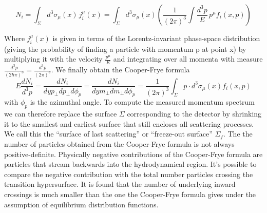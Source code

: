 \documentclass[12pt,a4paper]{book}
\begin{document}
	\begin{equation}
		N_i = \int_{\Sigma} d^3 \sigma_\mu(x) \, j_i^\mu(x) = \int_{\Sigma} d^3 \sigma_\mu(x) \left( \frac{1}{(2\pi)^3} \int \frac{d^3 p}{E} \, p^\mu f_i(x,p) \right)
		\label{eq:particle_number}
	\end{equation}
	
	
	Where $j_i^\mu(x)$ is given in terms of the Lorentz-invariant phase-space distribution (giving the probability of finding a particle with momentum p at point x) by multiplying it with the velocity $\frac{p^\mu}{E}$ and integrating over all momenta with measure $\frac{d^3 p}{(2\hbar\pi)^3}=\frac{d^3 p}{(2\pi)^3}$. We finally obtain the Cooper-Frye formula
	\begin{equation}
		\boxed{
			E \frac{dN_i}{d^3 p}= \frac{dN_i}{dy p_\perp dp_\perp d\phi_p} = \frac{dN_i}{dy m_\perp dm_\perp d\phi_p} = \frac{1}{(2\pi)^3} \int_{\Sigma} p \cdot d^3 \sigma_\mu (x) f_i (x,p) 
		}
		\label{eq:cooper-frye}
	\end{equation}
	with $\phi_p$ is the azimuthal angle. To compute the measured momentum spectrum we can therefore replace the surface $\Sigma$ corresponding to the detector by shrinking it to the smallest and earliest surface that still encloses all scattering processes. We call this the “surface of last scattering” or “freeze-out surface” $\Sigma_f$. The the number of particles obtained from the Cooper-Frye formula is not always positive-definite. Physically negative contributions of the Cooper-Frye formula are particles that stream backwards into the hydrodynamical region. It's possible to compare the negative contribution with the total number particles crossing the transition hypersurface. It is found that the number of underlying inward crossings is much smaller than the one the Cooper-Frye formula gives under the assumption of equilibrium distribution functions. 
	
\end{document}
